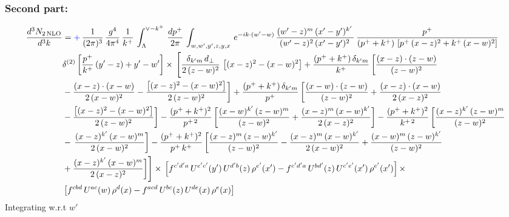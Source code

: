 \documentclass[9pt]{article}
\numberwithin{equation}{section}
\begin{document}
\subsubsection{Second part:\,}
\begin{align}
    \frac{d^{3}N_{2\,\rm NLO}}{d^{3}k} & = {\color{blue}+}\, \frac{1}{(2\pi)^{3}}\,\frac{g^{4}}{4\pi^{4}}\, \frac{1}{k^{+}}\,\int_{\Lambda}^{\vee-k^{+}}\, \frac{dp^{+}}{2\pi}\, \int_{w,w',y',z,y,x}\, e^{-ik\cdot (w'-w)}\, \frac{(w'-z)^{m}\,(x'-y')^{k'}\,}{(w'-z)^{2}\,(x'-y')^{2}\,}\, \frac{p^{+}}{(p^{+}+k^{+})\,\left[p^{+}\,(x-z)^{2}+k^{+}\,(x-w)^{2}\right]}\notag \\ & \delta^{(2)}\left[\frac{p^{+}}{k^{+}}\, (y'-z)+y'-w'\right]\times\, \Bigg[\frac{\delta_{k'm}\,d_{\perp}}{2\,(z-w)^{2}}\, \left[(x-z)^{2}-(x-w)^{2}\right]+\frac{(p^{+}+k^{+})\,\delta_{k'm}}{k^{+}}\,\bigg[\frac{(x-z)\cdot (z-w)}{(z-w)^{2}}\notag \\ & -\frac{(x-z)\cdot (x-w)}{2\,(x-w)^{2}}-\frac{\left[(x-z)^{2}-(x-w)^{2}\right]}{2\,(z-w)^{2}}\bigg]+\frac{(p^{+}+k^{+})\,\delta_{k'm}}{p^{+}}\,\bigg[\frac{(x-w)\cdot (z-w)}{(z-w)^{2}}+\frac{(x-z)\cdot (x-w)}{2\,(x-z)^{2}}\notag \\ & -\frac{\left[(x-z)^{2}-(x-w)^{2}\right]}{2\,(z-w)^{2}}\bigg]-\frac{(p^{+}+k^{+})^{2}}{p^{+\,2}}\,\bigg[\frac{(x-w)^{k'}\,(z-w)^{m}}{(z-w)^{2}}+\frac{(x-z)^{m}\,(x-w)^{k'}}{2\,(x-z)^{2}}\bigg]-\frac{(p^{+}+k^{+})^{2}}{k^{+\,2}}\,\bigg[\frac{(x-z)^{k'}\,(z-w)^{m}}{(z-w)^{2}}\notag \\ & -\,\frac{(x-z)^{k'}\,(x-w)^{m}}{2\,(x-w)^{2}}\bigg]-\frac{(p^{+}+k^{+})^{2}}{p^{+}\,k^{+}}\,\bigg[\frac{(x-z)^{m}\,(z-w)^{k'}}{(z-w)^{2}}-\frac{(x-z)^{m}\,(x-w)^{k'}}{2\,(x-w)^{2}}+\frac{(x-w)^{m}\,(z-w)^{k'}}{(z-w)^{2}}\notag \\ & +\frac{(x-z)^{k'}\,(x-w)^{m}}{2\,(x-z)^{2}}\bigg]\Bigg]\times\,\left[f^{c'd'a}\,U^{e'c'}(y')\,U^{d'b}(z)\,\rho^{e'}(x')-f^{c'd'a}\, 
    U^{bd'}(z)\,U^{c'e'}(x')\,\rho^{e'}(x')\right]\times \notag \\ & \left[f^{cbd}\,U^{ac}(w)\,\rho^{d}(x) -f^{acd}\,U^{bc}(z)\,U^{de}(x)\,\rho^{e}(x)\right]
\end{align}
Integrating w.r.t $w'$
\end{document}

